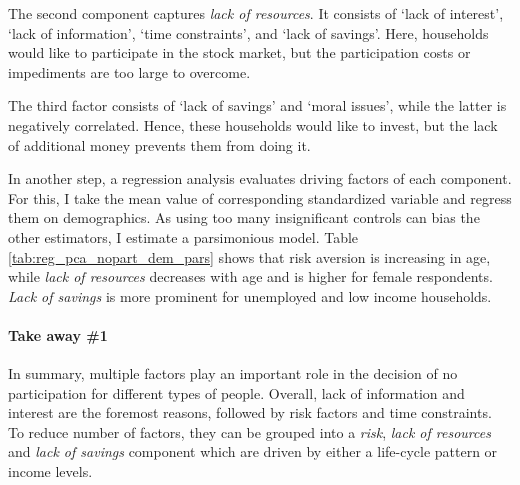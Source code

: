 \documentclass[ProjectABM]{subfiles}
\begin{document}
The second component captures \textit{lack of resources}. It consists of `lack of interest', `lack of information', `time constraints', and `lack of savings'. Here, households would like to participate in the stock market, but the participation costs or impediments are too large to overcome.

The third factor consists of `lack of savings' and `moral issues', while the latter is negatively correlated. Hence, these households would like to invest, but the lack of additional money prevents them from doing it.




%

In another step, a regression analysis evaluates driving factors of each component. For this, I take the mean value of corresponding standardized variable and regress them on demographics. As using too many insignificant controls can bias the other estimators, I estimate a parsimonious model. Table \ref{tab:reg_pca_nopart_dem_pars} shows that risk aversion is increasing in age, while \textit{lack of resources} decreases with age and is higher for female respondents. \textit{Lack of savings} is more prominent for unemployed and low income households.




\paragraph{Take away \#1}
In summary, multiple factors play an important role in the decision of no participation for different types of people. Overall, lack of information and interest are the foremost reasons, followed by risk factors and time constraints. To reduce number of factors, they can be grouped into a \textit{risk}, \textit{lack of resources} and \textit{lack of savings} component which are driven by either a life-cycle pattern or income levels. %
\end{document}

